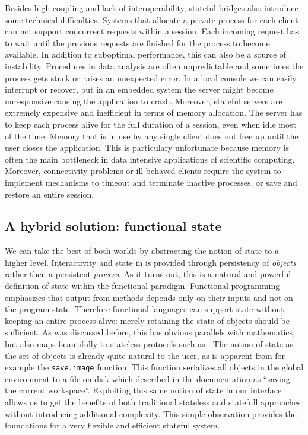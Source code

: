 Besides high coupling and lack of interoperability, stateful bridges also introduce some technical difficulties. Systems that allocate a private \R process for each client can not support concurrent requests within a session. Each incoming request has to wait until the previous requests are finished for the process to become available. In addition to suboptimal performance, this can also be a source of instability. Procedures in data analysis are often unpredictable and sometimes the \R process gets stuck or raises an unexpected error. In a local console we can easily interrupt or recover, but in an embedded system the server might become unresponsive causing the application to crash. Moreover, stateful servers are extremely expensive and inefficient in terms of memory allocation. The server has to keep each \R process alive for the full duration of a session, even when idle most of the time. Memory that is in use by any single client does not free up until the user closes the application. This is particulary unfortunate because memory is often the main bottleneck in data intensive applications of scientific computing. Moreover, connectivity problems or ill behaved clients require the system to implement mechanisms to timeout and terminate inactive processes, or save and restore an entire session.

\subsection{A hybrid solution: functional state}

We can take the best of both worlds by abstracting the notion of state to a higher level. Interactivity and state in \OpenCPU is provided through persistency of \emph{objects} rather then a persistent \emph{process}. As it turns out, this is a natural and powerful definition of state within the functional paradigm. Functional programming emphasizes that output from methods depends only on their inputs and not on the program state. Therefore functional languages can support state without keeping an entire process alive: merely retaining the state of objects should be sufficient. As was discussed before, this has obvious parallels with mathematics, but also maps beautifully to stateless protocols such as \HTTP. The notion of state as the set of objects is already quite natural to the \R user, as is apparent from for example the \texttt{save.image} function. This function serializes all objects in the global environment to a file on disk which described in the documentation as ``saving the current workspace''. Exploiting this same notion of state in our interface allows us to get the benefits of both traditional stateless and statefull approaches without introducing additional complexity. This simple observation provides the foundations for a very flexible and efficient stateful \RPC system.

